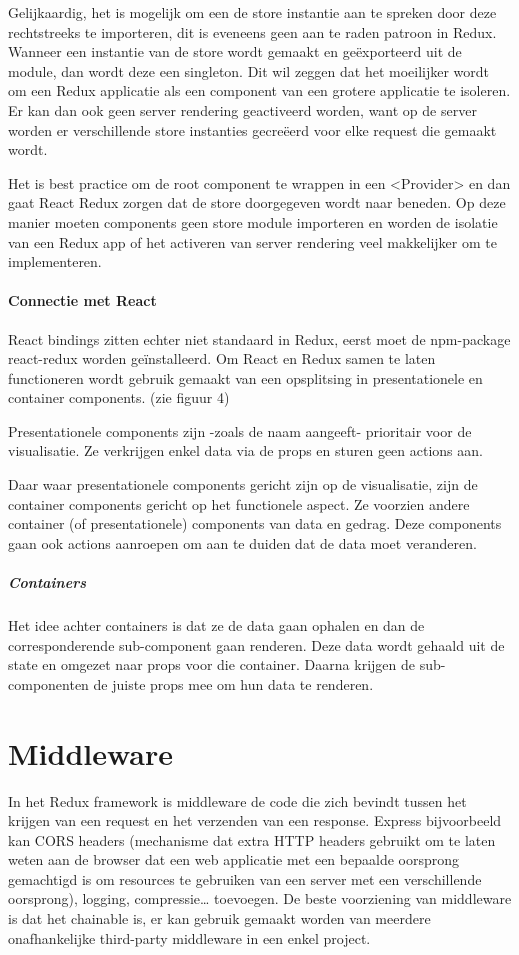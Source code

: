 Gelijkaardig, het is mogelijk om een de store instantie aan te spreken door deze rechtstreeks te importeren, dit is eveneens geen aan te raden patroon in Redux. Wanneer een instantie van de store wordt gemaakt en geëxporteerd uit de module, dan wordt deze een singleton. Dit wil zeggen dat het moeilijker wordt om een Redux applicatie als een component van een grotere applicatie te isoleren. Er kan dan ook geen server rendering geactiveerd worden, want op de server worden er verschillende store instanties gecreëerd voor elke request die gemaakt wordt.

Het is best practice om de root component te wrappen in een <Provider> en dan gaat React Redux zorgen dat de store doorgegeven wordt naar beneden. Op deze manier moeten components geen store module importeren en worden de isolatie van een Redux app of het activeren van server rendering veel makkelijker om te implementeren.


\autocite{Redux02}


\paragraph{Connectie met React}
React bindings zitten echter niet standaard in Redux, eerst moet de npm-package react-redux worden geïnstalleerd. Om React en Redux samen te laten functioneren wordt gebruik gemaakt van een opsplitsing in presentationele en container components. (zie figuur 4) 

Presentationele components zijn -zoals de naam aangeeft- prioritair voor de visualisatie. Ze verkrijgen enkel data via de props en sturen geen actions aan. 

Daar waar presentationele components gericht zijn op de visualisatie, zijn de container components gericht op het functionele aspect. Ze voorzien andere container (of presentationele) components van data en gedrag. Deze components gaan ook actions aanroepen om aan te duiden dat de data moet veranderen.  
\autocite{prescon}
\autocite{prescon2}

\subparagraph{Containers}
Het idee achter containers is dat ze de data gaan ophalen en dan de corresponderende sub-component gaan renderen. Deze data wordt gehaald uit de state en omgezet naar props voor die container. Daarna krijgen de sub-componenten de juiste props mee om hun data te renderen. 
\autocite{containercomp}

\section{Middleware}
In het Redux framework is middleware de code die zich bevindt tussen het krijgen van een request en het verzenden van een response. Express bijvoorbeeld kan CORS headers (mechanisme dat extra HTTP headers gebruikt om te laten weten aan de browser dat een web applicatie met een bepaalde oorsprong gemachtigd is om resources te gebruiken van een server met een verschillende oorsprong), logging, compressie… toevoegen. De beste voorziening van middleware is dat het chainable is, er kan gebruik gemaakt worden van meerdere onafhankelijke third-party middleware in een enkel project.
 
